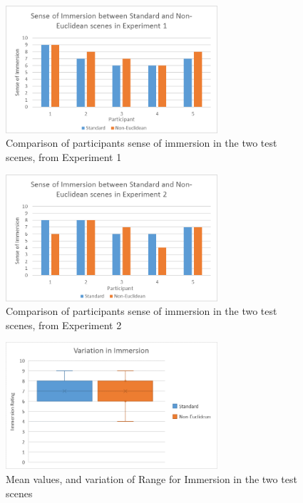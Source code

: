 	\begin{figure}
		\label{exp:fig:compare_immersion_exp1}
		\includegraphics[width=0.7\textwidth]{Images/Compare_Immersion_Exp_1}
		\centering
		\caption{Comparison of participants sense of immersion in the two test scenes, from Experiment 1}
	\end{figure}

	\begin{figure}
		\label{exp:fig:compare_immersion_exp2}
		\includegraphics[width=0.7\textwidth]{Images/Compare_Immersion_Exp_2}
		\centering
		\caption{Comparison of participants sense of immersion in the two test scenes, from Experiment 2}
	\end{figure}

	\begin{figure}
		\label{exp:fig:compare_immersion_variation}
		\includegraphics[width=0.7\textwidth]{Images/Compare_Immersion_Variation}
		\centering
		\caption{Mean values, and variation of Range for Immersion in the two test scenes}
	\end{figure}
